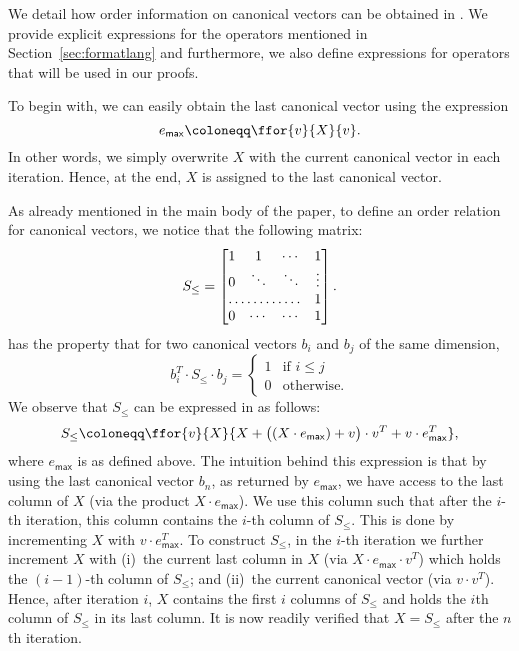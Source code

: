 We detail how order information on canonical vectors can be obtained in \langfor.
We provide explicit expressions for the operators mentioned in Section~\ref{sec:formatlang}
and furthermore, we also define expressions for operators that will be used in our proofs.

To begin with, we can easily obtain the last canonical vector using the expression 
$$
e_{\mathsf{max}} \coloneqq  \ffor{v}{X}{v}.
$$ 
In other words, we simply overwrite $X$ with the current canonical vector in each iteration.
Hence, at the end, $X$ is assigned to the last canonical vector.

%
As already mentioned in the main body of the paper,
to define an order relation for canonical vectors, we notice that the following matrix:
\[
S_{\leq} = \begin{bmatrix}
    1 & 1 & \cdots &  1 \\
    0 & \ddots & \ddots & \vdots \\
    \hdotsfor{3} & 1 \\
    0 & \cdots & \cdots & 1 
\end{bmatrix}.
\]
has the property that for two canonical vectors $b_i$ and $b_j$ of the same dimension, 
$$b_i^T\cdot S_{\leq} \cdot b_j=\begin{cases}1 & \text{if $i\leq j$}\\
0 &\text{otherwise}.
\end{cases}
$$
We observe that $S_{\leq}$ can be expressed in \langfor as 
follows:
$$
S_{\leq}\coloneqq \ffor{v}{X}{X + \bigl((X\cdot e_{\mathsf{max}}) + v \bigr)\cdot v^T + v\cdot e^T_{\mathsf{max}}},
$$
where $e_{\mathsf{max}}$ is as defined above. 
The intuition behind this expression is that by using the last canonical vector $b_n$, as returned by $e_{\mathsf{max}}$, we have access to the last column of $X$ (via the product $X\cdot e_{\mathsf{max}}$). We use this column such that after the $i$-th iteration, this column contains the $i$-th column of $S_{\leq}$. This is done by incrementing $X$ with $v\cdot e_{\mathsf{max}}^T$.
To construct $S_{\leq}$, in the $i$-th iteration we further increment $X$ with 
(i)~the current last column in $X$ (via $X\cdot e_{\mathsf{max}}\cdot v^T$) which holds
the $(i-1)$-th column of $S_{\leq}$; and (ii)~the current canonical vector (via $v\cdot v^T$). Hence, after iteration $i$, $X$ contains the first $i$ columns of $S_{\leq}$ and holds the $i$th column of $S_{\leq}$ in its last column. It is now readily verified that $X=S_{\leq}$ after the $n$th iteration.
%
%

